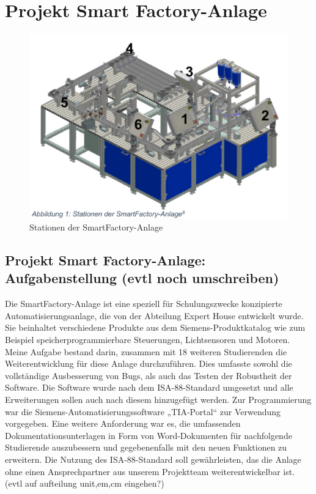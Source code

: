 \chapter{Projekt Smart Factory-Anlage}\label{ch:data}



\begin{figure}[h!]
    \centering
    \includegraphics{figures/Screenshot 2025-01-03 124137.png}
    \caption{Stationen der SmartFactory-Anlage\cite{bee2022}} %
    \label{Stationen der SmartFactory-Anlage} %
\end{figure}

\section{Projekt Smart Factory-Anlage: Aufgabenstellung (evtl noch umschreiben)}\label{sec:Projekt Smart Factory-Anlage: Aufgabenstellung (evtl noch umschreiben)}

Die SmartFactory-Anlage ist eine speziell für Schulungszwecke konzipierte
Automatisierungsanlage, die von der Abteilung Expert House entwickelt wurde. Sie beinhaltet verschiedene Produkte aus dem Siemens-Produktkatalog wie zum Beispiel speicherprogrammierbare Steuerungen, Lichtsensoren und Motoren.
Meine Aufgabe bestand darin, zusammen mit 18 weiteren Studierenden die
Weiterentwicklung für diese Anlage durchzuführen. Dies umfasste sowohl die
vollständige Ausbesserung von Bugs, als auch das Testen der Robustheit der Software. Die Software wurde nach dem 
ISA-88-Standard umgesetzt und alle Erweiterungen sollen auch nach diesem hinzugefügt werden. Zur Programmierung war 
die Siemens-Automatisierungssoftware „TIA-Portal“ zur Verwendung vorgegeben. Eine weitere Anforderung war es, die 
umfassenden Dokumentationsunterlagen in Form von Word-Dokumenten für nachfolgende Studierende auszubessern und 
gegebenenfalls mit den neuen Funktionen zu erweitern. Die Nutzung des ISA-88-Standard soll gewährleisten, das die Anlage 
ohne einen Ansprechpartner aus unserem Projektteam weiterentwickelbar ist. 
(evtl auf aufteilung unit,em,cm eingehen?)


